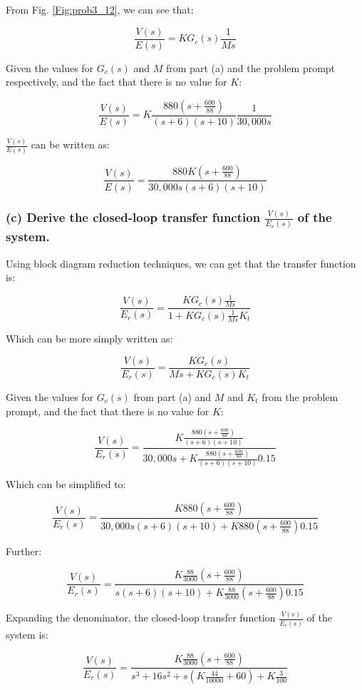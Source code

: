 \documentclass[12pt, letterpaper]{../assignment}
\begin{document}
From Fig. \ref{Fig:prob3_12}, we can see that:

$$ \frac{V(s)}{E(s)} = K G_c(s) \frac{1}{M s} $$

Given the values for $G_c(s)$ and $M$ from part (a) and the problem prompt respectively,
and the fact that there is no value for $K$:

$$ \frac{V(s)}{E(s)} = K \frac{880\left(s + \frac{600}{88}\right)}{(s+6)(s+10)} \frac{1}{30,000 s} $$

$\frac{V(s)}{E(s)}$ can be written as:

\begin{answer}
$$ \frac{V(s)}{E(s)} = \frac{880 K \left(s + \frac{600}{88}\right)}{30,000 s(s+6)(s+10)} $$
\end{answer}

\subsubsection*{(c) Derive the closed-loop transfer function $\frac{V(s)}{E_r(s)}$ of the system.}

Using block diagram reduction techniques, we can get that the transfer function is:

$$ \frac{V(s)}{E_r(s)} =  \frac{K G_c(s) \frac{1}{M s}}{1 + K G_c(s) \frac{1}{M s}K_t} $$

Which can be more simply written as:

$$ \frac{V(s)}{E_r(s)} =  \frac{K G_c(s)}{M s + K G_c(s) K_t} $$

Given the values for $G_c(s)$ from part (a) and $M$ and $K_t$ from the problem prompt,
and the fact that there is no value for $K$:

$$ \frac{V(s)}{E_r(s)} = 
\frac{K \frac{880\left(s + \frac{600}{88}\right)}{(s+6)(s+10)}}{30,000 s + K \frac{880\left(s + \frac{600}{88}\right)}{(s+6)(s+10)} 0.15} $$

Which can be simplified to:

$$ \frac{V(s)}{E_r(s)} = 
\frac{K 880\left(s + \frac{600}{88}\right)}{30,000 s(s+6)(s+10) + K 880\left(s + \frac{600}{88}\right) 0.15} $$

Further:

$$ \frac{V(s)}{E_r(s)} = 
\frac{K \frac{88}{3000}\left(s + \frac{600}{88}\right)}{s(s+6)(s+10) + K \frac{88}{3000}\left(s + \frac{600}{88}\right) 0.15} $$

Expanding the denominator, the closed-loop transfer function $\frac{V(s)}{E_r(s)}$ of the system is:

\begin{answer}
$$ \frac{V(s)}{E_r(s)} = 
\frac{K \frac{88}{3000}\left(s + \frac{600}{88}\right)}{s^3+16s^2 + s \left(K\frac{44}{10000}+ 60\right) + K \frac{3}{100} } $$
\end{answer}
\end{document}
